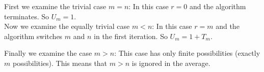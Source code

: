 First we examine the trivial case $m = n$: In this case $r = 0$ and the algorithm terminates. So $U_m = 1$. \\

Now we examine the equally trivial case $m < n$: In this case $r = m$ and the algorithm switches $m$ and $n$ in the first iteration. So $U_m = 1 + T_m$.

Finally we examine the case $m > n$: This case has only finite possibilities (exactly $m$ possibilities). This means that $m > n$ is ignored in the average.

